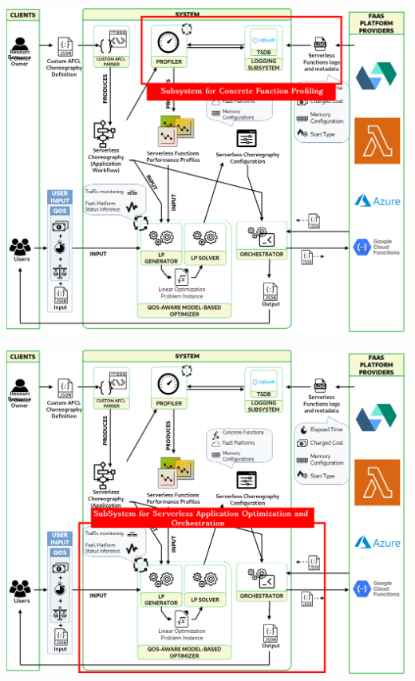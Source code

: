 \documentclass[13.5pt]{beamer}
\begin{document}
\begin{frame}
	
	\begin{center}
		\includegraphics[width=\textwidth,height=0.95\textheight]{../Images/SystemForSlide1.png}
	\end{center}
	
	
\end{frame} 
\begin{frame}
	
	\begin{center}
		\includegraphics[width=\textwidth,height=0.95\textheight]{../Images/SystemForSlide2.png}
	\end{center}
	
	
\end{frame} 
\end{document}
